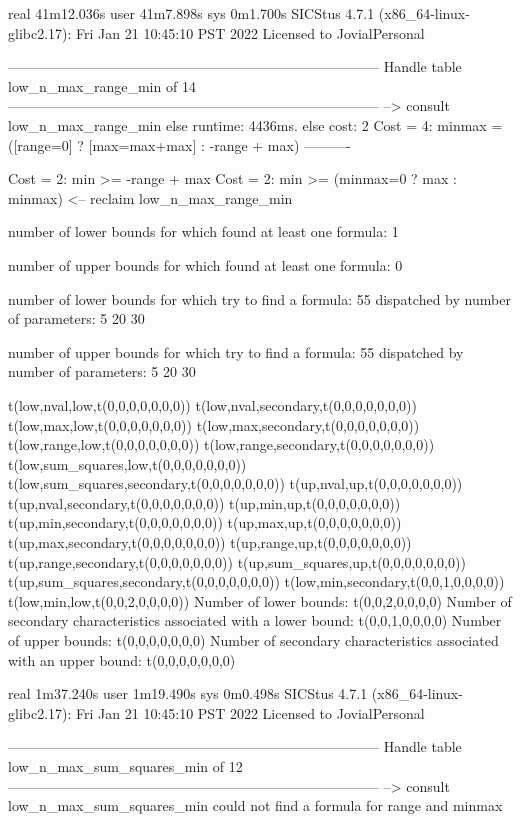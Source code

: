 real	41m12.036s
user	41m7.898s
sys	0m1.700s
SICStus 4.7.1 (x86_64-linux-glibc2.17): Fri Jan 21 10:45:10 PST 2022
Licensed to JovialPersonal


--------------------------------------------------------------------------------
Handle table low_n_max_range_min of 14
--------------------------------------------------------------------------------
--> consult low_n_max_range_min
else runtime: 4436ms. else cost: 2
Cost =  4:  minmax = ([range=0] ? [max=max+max] : -range + max) %
----------

Cost =  2:  min >= -range + max
Cost =  2:  min >= (minmax=0 ? max : minmax)
<-- reclaim low_n_max_range_min

number of lower bounds for which found at least one formula: 1

number of upper bounds for which found at least one formula: 0

number of lower bounds for which try to find a formula: 55
dispatched by number of parameters: 5  20  30

number of upper bounds for which try to find a formula: 55
dispatched by number of parameters: 5  20  30

t(low,nval,low,t(0,0,0,0,0,0,0))
t(low,nval,secondary,t(0,0,0,0,0,0,0))
t(low,max,low,t(0,0,0,0,0,0,0))
t(low,max,secondary,t(0,0,0,0,0,0,0))
t(low,range,low,t(0,0,0,0,0,0,0))
t(low,range,secondary,t(0,0,0,0,0,0,0))
t(low,sum_squares,low,t(0,0,0,0,0,0,0))
t(low,sum_squares,secondary,t(0,0,0,0,0,0,0))
t(up,nval,up,t(0,0,0,0,0,0,0))
t(up,nval,secondary,t(0,0,0,0,0,0,0))
t(up,min,up,t(0,0,0,0,0,0,0))
t(up,min,secondary,t(0,0,0,0,0,0,0))
t(up,max,up,t(0,0,0,0,0,0,0))
t(up,max,secondary,t(0,0,0,0,0,0,0))
t(up,range,up,t(0,0,0,0,0,0,0))
t(up,range,secondary,t(0,0,0,0,0,0,0))
t(up,sum_squares,up,t(0,0,0,0,0,0,0))
t(up,sum_squares,secondary,t(0,0,0,0,0,0,0))
t(low,min,secondary,t(0,0,1,0,0,0,0))
t(low,min,low,t(0,0,2,0,0,0,0))
Number of lower bounds:                                             t(0,0,2,0,0,0,0)
Number of secondary characteristics associated with a lower bound:  t(0,0,1,0,0,0,0)
Number of upper bounds:                                             t(0,0,0,0,0,0,0)
Number of secondary characteristics associated with an upper bound: t(0,0,0,0,0,0,0)

real	1m37.240s
user	1m19.490s
sys	0m0.498s
SICStus 4.7.1 (x86_64-linux-glibc2.17): Fri Jan 21 10:45:10 PST 2022
Licensed to JovialPersonal


--------------------------------------------------------------------------------
Handle table low_n_max_sum_squares_min of 12
--------------------------------------------------------------------------------
--> consult low_n_max_sum_squares_min
could not find a formula for range and minmax

